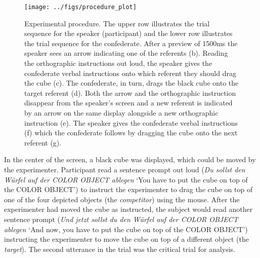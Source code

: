 \documentclass[Review,times,sageh]{sagej}
\begin{document}
\begin{figure}
\texttt{[image: ../figs/procedure\_plot]} \caption{Experimental procedure. The upper row illustrates the trial sequence for the speaker (participant) and the lower row illustrates the trial sequence for the confederate. After a preview of 1500ms the speaker sees an arrow indicating one of the referents (b). Reading the orthographic instructions out loud, the speaker gives the confederate verbal instructions onto which referent they should drag the cube (c). The confederate, in turn, drags the black cube onto the target referent (d). Both the arrow and the orthographic instruction disappear from the speaker's screen and a new referent is indicated by an arrow on the same display alongside a new orthographic instruction (e). The speaker gives the confederate verbal instructions (f) which the confederate follows by dragging the cube onto the next referent (g).}\label{fig:procedural}
\end{figure}

In the center of the screen, a black cube was displayed, which could be moved by the experimenter.
Participant read a sentence prompt out loud (\emph{Du sollst den Würfel auf der COLOR OBJECT ablegen} `You have to put the cube on top of the COLOR OBJECT') to instruct the experimenter to drag the cube on top of one of the four depicted objects (the \emph{competitor}) using the mouse.
After the experimenter had moved the cube as instructed, the subject would read another sentence prompt (\emph{Und jetzt sollst du den Würfel auf der COLOR OBJECT ablegen} `And now, you have to put the cube on top of the COLOR OBJECT') instructing the experimenter to move the cube on top of a different object (the \emph{target}).
The second utterance in the trial was the critical trial for analysis.
\end{document}
